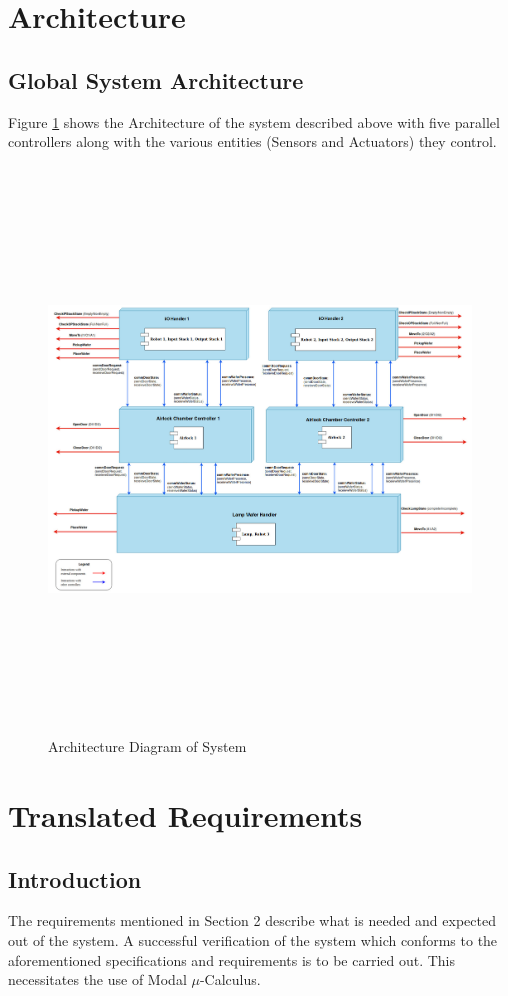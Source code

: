 \documentclass[a4paper,12pt]{article}
\begin{document}
	\section{Architecture}
	\subsection{Global System Architecture}
	Figure \ref{fig:arch1} shows the Architecture of the system described above with five parallel controllers along with the various entities (Sensors and Actuators) they control.
	
	\begin{figure}[ht]
		\centerline{
			\includegraphics[width=19cm, height=15cm]{Architecture-final.jpg}}
		\caption{Architecture Diagram of System}
		\label{fig:arch1}
	\end{figure}
	\newpage
	\section{Translated Requirements}
	\subsection{Introduction}
	The requirements mentioned in Section 2 describe what is needed and expected out of the system. A successful verification of the system which conforms to the aforementioned specifications and requirements is to be carried out. This necessitates the use of Modal $\mu$-Calculus.   
\end{document}
